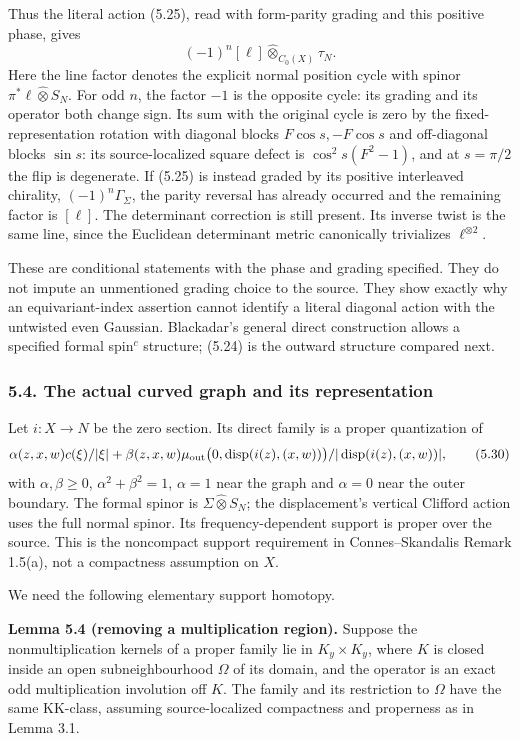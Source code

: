 \documentclass[
  11pt,
]{article}
\begin{document}
Thus the literal action (5.25), read with form-parity grading and this
positive phase, gives \[
(-1)^n[\ell]\widehat\otimes_{C_0(X)}\tau_N .
\tag{5.29}
\] Here the line factor denotes the explicit normal position cycle with
spinor \(\pi^*\ell\widehat\otimes S_N\). For odd \(n\), the factor
\(-1\) is the opposite cycle: its grading and its operator both change
sign. Its sum with the original cycle is zero by the
fixed-representation rotation with diagonal blocks \(F\cos s,-F\cos s\)
and off-diagonal blocks \(\sin s\): its source-localized square defect
is \(\cos^2s(F^2-1)\), and at \(s=\pi/2\) the flip is degenerate. If
(5.25) is instead graded by its positive interleaved chirality,
\((-1)^n\Gamma_\Sigma\), the parity reversal has already occurred and
the remaining factor is \([\ell]\). The determinant correction is still
present. Its inverse twist is the same line, since the Euclidean
determinant metric canonically trivializes \(\ell^{\otimes2}\).

These are conditional statements with the phase and grading specified.
They do not impute an unmentioned grading choice to the source. They
show exactly why an equivariant-index assertion cannot identify a
literal diagonal action with the untwisted even Gaussian. Blackadar's
general direct construction allows a specified formal spin\(^{c}\)
structure; (5.24) is the outward structure compared next.

\subsubsection{5.4. The actual curved graph and its
representation}\label{the-actual-curved-graph-and-its-representation}

Let \(i:X\to N\) be the zero section. Its direct family is a proper
quantization of \[
\alpha(z,x,w)c(\xi)/|\xi|+
\beta(z,x,w)\mu_{\rm out}\bigl(0,\operatorname{disp}(i(z),(x,w))\bigr)/
|\operatorname{disp}(i(z),(x,w))|,
\tag{5.30}
\] with \(\alpha,\beta\geq0\), \(\alpha^2+\beta^2=1\), \(\alpha=1\) near
the graph and \(\alpha=0\) near the outer boundary. The formal spinor is
\(\Sigma\widehat\otimes S_N\); the displacement's vertical Clifford
action uses the full normal spinor. Its frequency-dependent support is
proper over the source. This is the noncompact support requirement in
Connes--Skandalis Remark 1.5(a), not a compactness assumption on \(X\).

We need the following elementary support homotopy.

\textbf{Lemma 5.4 (removing a multiplication region).} Suppose the
nonmultiplication kernels of a proper family lie in \(K_y\times K_y\),
where \(K\) is closed inside an open subneighbourhood \(\Omega\) of its
domain, and the operator is an exact odd multiplication involution off
\(K\). The family and its restriction to \(\Omega\) have the same
KK-class, assuming source-localized compactness and properness as in
Lemma 3.1.
\end{document}
